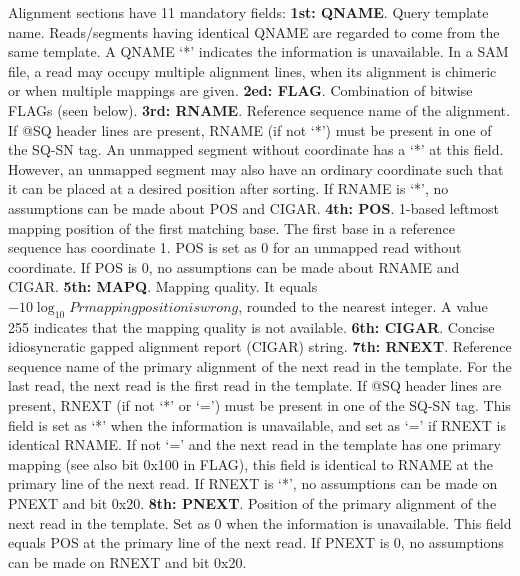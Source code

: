 \documentclass[11pt]{article}
\begin{document}
\begin{sloppypar}
Alignment sections have 11 mandatory fields:
\newline
\textbf{1st: QNAME}. 
Query template name. 
Reads/segments having identical QNAME are regarded to come from the same template. 
A QNAME ‘*’ indicates the information is unavailable. 
In a SAM file, a read may occupy multiple alignment lines, when its alignment is chimeric or when multiple mappings are given.
\newline
\textbf{2ed: FLAG}. 
Combination of bitwise FLAGs (seen below).
\newline
\textbf{3rd: RNAME}. 
Reference sequence name of the alignment. 
If @SQ header lines are present, RNAME (if not ‘*’) must be present in one of the SQ-SN tag. 
An unmapped segment without coordinate has a ‘*’ at this field. 
However, an unmapped segment may also have an ordinary coordinate such that it can be placed at a desired position after sorting. 
If RNAME is ‘*’, no assumptions can be made about POS and CIGAR.
\newline
\textbf{4th: POS}. 
1-based leftmost mapping position of the first matching base. 
The first base in a reference sequence has coordinate 1. 
POS is set as 0 for an unmapped read without coordinate. 
If POS is 0, no assumptions can be made about RNAME and CIGAR.
\newline
\textbf{5th: MAPQ}. 
Mapping quality. 
It equals $−10 \log_{10} Pr{mapping position is wrong}$, rounded to the nearest integer. 
A value 255 indicates that the mapping quality is not available.
\newline
\textbf{6th: CIGAR}. 
Concise idiosyncratic gapped alignment report (CIGAR) string.
\newline
\textbf{7th: RNEXT}. 
Reference sequence name of the primary alignment of the next read in the template. 
For the last read, the next read is the first read in the template. 
If @SQ header lines are present, RNEXT (if not ‘*’ or ‘=’) must be present in one of the SQ-SN tag. 
This field is set as ‘*’ when the information is unavailable, and set as ‘=’ if RNEXT is identical RNAME. 
If not ‘=’ and the next read in the template has one primary mapping (see also bit 0x100 in FLAG), this field is identical to RNAME at the primary line of the next read. 
If RNEXT is ‘*’, no assumptions can be made on PNEXT and bit 0x20.
\newline
\textbf{8th: PNEXT}. 
Position of the primary alignment of the next read in the template. 
Set as 0 when the information is unavailable. 
This field equals POS at the primary line of the next read. 
If PNEXT is 0, no assumptions can be made on RNEXT and bit 0x20.

\end{sloppypar}
\end{document}
